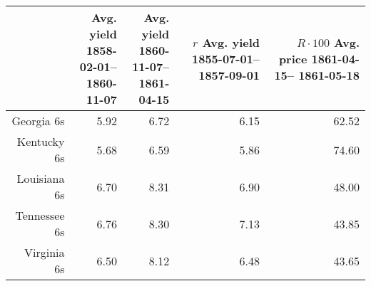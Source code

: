 \begin{tabular}{rrrrr}
  \hline
 & \parbox{2.5cm}{\raggedleft Avg. yield \\ 1858-02-01--\\1860-11-07} & \parbox{2.5cm}{\raggedleft Avg. yield \\ 1860-11-07--\\1861-04-15} & \parbox{2.5cm}{\raggedleft $r$\\ Avg. yield \\ 1855-07-01--\\1857-09-01} & \parbox{2.5cm}{\raggedleft $R \cdot 100$ \\ Avg. price \\ 1861-04-15--\\1861-05-18} \\ 
  \hline
Georgia 6s & 5.92 & 6.72 & 6.15 & 62.52 \\ 
  Kentucky 6s & 5.68 & 6.59 & 5.86 & 74.60 \\ 
  Louisiana 6s & 6.70 & 8.31 & 6.90 & 48.00 \\ 
  Tennessee 6s & 6.76 & 8.30 & 7.13 & 43.85 \\ 
  Virginia 6s & 6.50 & 8.12 & 6.48 & 43.65 \\ 
   \hline
\end{tabular}
